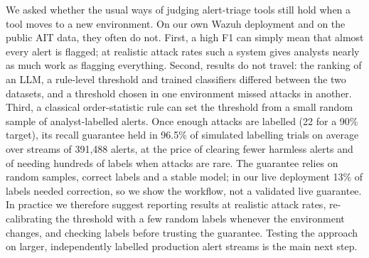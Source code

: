 \documentclass[conference]{IEEEtran}
\begin{document}
We asked whether the usual ways of judging alert-triage tools still hold when a tool moves to a
new environment. On our own Wazuh deployment and on the public AIT data, they often do not. First,
a high F1 can simply mean that almost every alert is flagged; at realistic attack rates such a
system gives analysts nearly as much work as flagging everything. Second, results do not travel:
the ranking of an LLM, a rule-level threshold and trained classifiers differed between the two
datasets, and a threshold chosen in one environment missed attacks in another. Third, a classical
order-statistic rule can set the threshold from a small random sample of analyst-labelled alerts.
Once enough attacks are labelled (22 for a 90\% target), its recall guarantee held in 96.5\% of
simulated labelling trials on average over streams of 391,488 alerts, at the price of clearing
fewer harmless alerts and of needing hundreds of labels when attacks are rare. The guarantee
relies on random samples, correct labels and a stable model; in our live deployment 13\% of labels
needed correction, so we show the workflow, not a validated live guarantee. In practice we
therefore suggest reporting results at realistic attack rates, re-calibrating the threshold with
a few random labels whenever the environment changes, and checking labels before trusting the
guarantee. Testing the approach on larger, independently labelled production alert streams is the
main next step.
\end{document}

